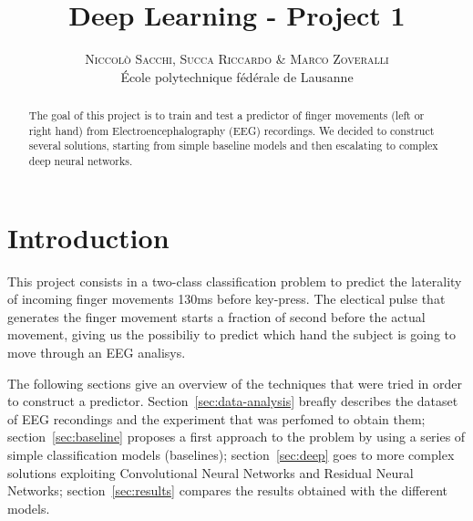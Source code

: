 \documentclass[10pt,conference,compsocconf]{IEEEtran}
\begin{document}
	
\pretitle{\begin{center}\Huge\bfseries} %
\posttitle{\end{center}} %
\title{Deep Learning - Project 1}

\author{
	\textsc{Niccol\`{o} Sacchi, Succa Riccardo \& Marco Zoveralli}
	\normalsize{} \\
	\normalsize \'{E}cole polytechnique f\'{e}d\'{e}rale de Lausanne
}

\maketitle

\begin{abstract}
  The goal of this project is to train and test a predictor of finger movements (left or right hand) from Electroencephalography (EEG) recordings. We decided to construct several solutions, starting from simple baseline models and then escalating to complex deep neural networks. 
\end{abstract}

\section{Introduction}
This project consists in a two-class classification problem to predict the laterality of incoming finger movements 130ms before key-press. The electical pulse that generates the finger movement starts a fraction of second before the actual movement, giving us the possibiliy to predict which hand the subject is going to move through an EEG analisys.


The following sections give an overview of the techniques that were tried in order to construct a predictor. Section~\ref{sec:data-analysis} breafly describes the dataset of EEG recondings and the experiment that was perfomed to obtain them; section~\ref{sec:baseline} proposes a first approach to the problem by using a series of simple classification models (baselines); section~\ref{sec:deep} goes to more complex solutions exploiting Convolutional Neural Networks and Residual Neural Networks; section~\ref{sec:results} compares the results obtained with the different models.
\end{document}
